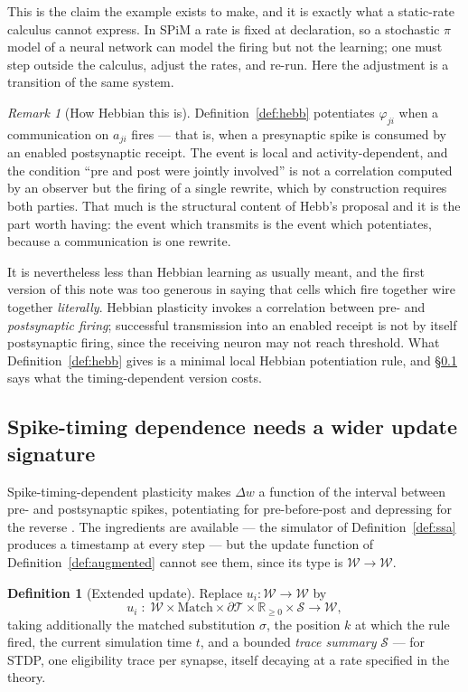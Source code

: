 \documentclass[11pt,a4paper]{article}
\theoremstyle{plain}
\theoremstyle{definition}
\newtheorem{definition}[theorem]{Definition}
\theoremstyle{remark}
\newtheorem{remark}[theorem]{Remark}
\newcommand{\Terms}{\mathcal{T}}
\newcommand{\Wt}{\mathcal{W}}
\begin{document}
This is the claim the example exists to make, and it is exactly what a static-rate calculus cannot
express. In SPiM a rate is fixed at declaration, so a stochastic $\pi$ model of a neural network can
model the firing but not the learning; one must step outside the calculus, adjust the rates, and
re-run. Here the adjustment is a transition of the same system.

\begin{remark}[How Hebbian this is]
\label{rem:hebbian}
Definition~\ref{def:hebb} potentiates $\varphi_{ji}$ when a communication on $a_{ji}$ fires --- that
is, when a presynaptic spike is consumed by an enabled postsynaptic receipt. The event is local and
activity-dependent, and the condition ``pre and post were jointly involved'' is not a correlation
computed by an observer but the firing of a single rewrite, which by construction requires both
parties. That much is the structural content of Hebb's proposal \cite{hebb} and it is the part worth
having: the event which transmits is the event which potentiates, because a communication is one
rewrite.

It is nevertheless less than Hebbian learning as usually meant, and the first version of this note
was too generous in saying that cells which fire together wire together \emph{literally}. Hebbian
plasticity invokes a correlation between pre- and \emph{postsynaptic firing}; successful transmission
into an enabled receipt is not by itself postsynaptic firing, since the receiving neuron may not
reach threshold. What Definition~\ref{def:hebb} gives is a minimal local Hebbian potentiation rule,
and \S\ref{sec:stdp} says what the timing-dependent version costs.
\end{remark}

\subsection{Spike-timing dependence needs a wider update signature}
\label{sec:stdp}

Spike-timing-dependent plasticity makes $\Delta w$ a function of the interval between pre- and
postsynaptic spikes, potentiating for pre-before-post and depressing for the reverse \cite{stdp}.
The ingredients are available --- the simulator of Definition~\ref{def:ssa} produces a timestamp at
every step --- but the update function of Definition~\ref{def:augmented} cannot see them, since its
type is $\Wt \to \Wt$.

\begin{definition}[Extended update]
\label{def:extended-update}
Replace $u_i : \Wt \to \Wt$ by
\[
u_i \;:\; \Wt \times \mathrm{Match} \times \partial\Terms \times \mathbb{R}_{\geq 0} \times \mathcal{S} \longrightarrow \Wt ,
\]
taking additionally the matched substitution $\sigma$, the position $k$ at which the rule fired, the
current simulation time $t$, and a bounded \emph{trace summary} $\mathcal{S}$ --- for STDP, one
eligibility trace per synapse, itself decaying at a rate specified in the theory.
\end{definition}
\end{document}
